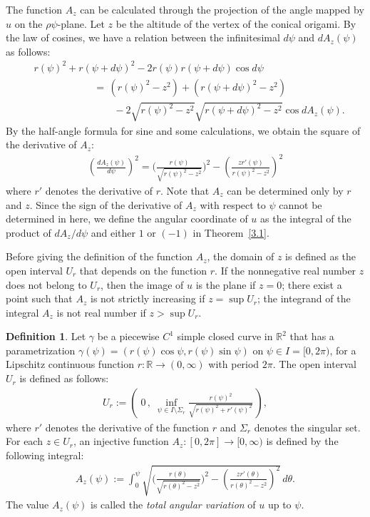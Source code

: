 \documentclass{amsart}
\theoremstyle{plain}
\theoremstyle{definition}
\newtheorem*{definition}{Definition}
\theoremstyle{remark}
\begin{document}
The function $A_z$ can be calculated through the projection of the angle mapped by $u$ on the $\rho\psi$-plane.
Let $z$ be the altitude of the vertex of the conical origami.
By the law of cosines, we have a relation between the infinitesimal $d\psi$ and $dA_z(\psi)$ as follows:
\begin{align*}
&r(\psi)^2+r(\psi+d\psi)^2-2r(\psi)r(\psi+d\psi)\cos d\psi\,
\\&\qquad\qquad\qquad=\,\left(r(\psi)^2-z^2\right)+\left(r(\psi+d\psi)^2-z^2\right)
\\&\qquad\qquad\qquad\qquad-2\sqrt{r(\psi)^2-z^2}\sqrt{r(\psi+d\psi)^2-z^2}\cos dA_z(\psi).
\end{align*}
By the half-angle formula for sine and some calculations, we obtain the square of the derivative of $A_z$:
\begin{align*}
\left(\frac{dA_z(\psi)}{d\psi}\right)^2=\biggl(\frac{r(\psi)}{\sqrt{r(\psi)^2-z^2}}\biggr)^2-\left(\frac{zr'(\psi)}{r(\psi)^2-z^2}\right)^2
\end{align*}
where $r'$ denotes the derivative of $r$.
Note that $A_z$ can be determined only by $r$ and $z$.
Since the sign of the derivative of $A_z$ with respect to $\psi$ cannot be determined in here, we define the angular coordinate of $u$ as the integral of the product of $dA_z/d\psi$ and either $1$ or $(-1)$ in Theorem~\ref{3.1}.

Before giving the definition of the function $A_z$, the domain of $z$ is defined as the open interval $U_r$ that depends on the function $r$. 
If the nonnegative real number $z$ does not belong to $U_r$, then the image of $u$ is the plane if $z=0$; there exist a point such that $A_z$ is not strictly increasing if $z=\sup U_r$; the integrand of the integral $A_z$ is not real number if $z>\sup U_r$.


\begin{definition}%
Let $\gamma$ be a piecewise $C^1$ simple closed curve in $\mathbb{R}^2$ that has a parametrization $\gamma(\psi)=(r(\psi)\cos\psi,r(\psi)\sin\psi)$ on $\psi\in I=[0,2\pi)$, for a Lipschitz continuous function $r \colon \mathbb{R}\to(0,\infty)$ with period $2\pi$.
The open interval $U_r$ is defined as follows:
\begin{align*}
U_r:=\left(\;0\,,\;\inf_{\psi\in I\setminus\Sigma_r}\frac{r(\psi)^2}{\sqrt{r(\psi)^2+r'(\psi)^2}}\,\right),
\end{align*}
where $r'$ denotes the derivative of the function $r$ and $\Sigma_r$ denotes the singular set.
For each $z\in U_r$, an injective function  $A_z \colon [0,2\pi]\to[0,\infty)$ is defined by the following integral:
\begin{align*}
A_z(\psi):=\int_0^{\psi}\sqrt{\biggl(\frac{r(\theta)}{\sqrt{r(\theta)^2-z^2}}\biggr)^2-\left(\frac{zr'(\theta)}{r(\theta)^2-z^2}\right)^2}\,d\theta.
\end{align*}
The value $A_z(\psi)$ is called the \emph{total angular variation} of $u$ up to $\psi$.
\end{definition}
\end{document}
